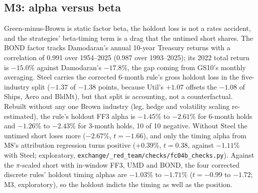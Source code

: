 \subsection{M3: alpha versus beta}
\label{app:m3}
Green-minus-Brown is static factor beta, the holdout loss is not a rates accident, and the strategies' beta-timing term is a drag that the untimed short shares. The BOND factor tracks Damodaran's annual 10-year Treasury returns with a correlation of 0.991 over 1954--2025 (0.987 over 1993--2025); its 2022 total return is $-15.0$\% against Damodaran's $-17.8$\%, the gap coming from GS10's monthly averaging. Steel carries the corrected 6-month rule's gross holdout loss in the five-industry split ($-1.37$ of $-1.38$ points, because Util's $+1.07$ offsets the $-1.08$ of Ships, Aero and BldMt), but that split is accounting, not a counterfactual. Rebuilt without any one Brown industry (leg, hedge and volatility scaling re-estimated), the rule's holdout FF3 alpha is $-1.45$\% to $-2.61$\% for 6-month holds and $-1.26$\% to $-2.43$\% for 3-month holds, 10 of 10 negative. Without Steel the untimed short loses more ($-2.67$\%, $t=-1.66$), and only the timing alpha from M8's attribution regression turns positive ($+0.39$\%, $t=0.38$, against $-1.11$\% with Steel; exploratory, \texttt{exchange/\_red\_team/\allowbreak checks/\allowbreak fc04b\_checks.py}). Against the $\pi$-scaled short with in-window FF3, UMD and BOND, the four corrected discrete rules' holdout timing alphas are $-1.03$\% to $-1.71$\% ($t=-0.99$ to $-1.72$; M3, exploratory), so the holdout indicts the timing as well as the position.

